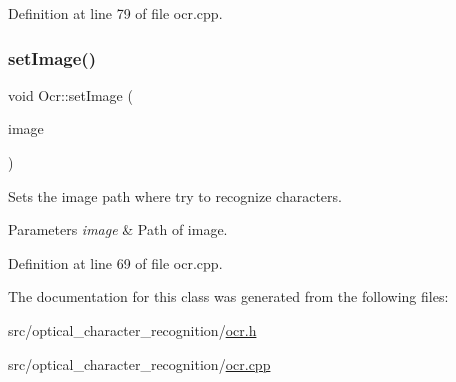 Definition at line 79 of file ocr.\+cpp.

\mbox{\label{classOcr_acdc41b9a0663c194d0fbede8c26ea319}} 
\subsubsection{\texorpdfstring{set\+Image()}{setImage()}}
{\footnotesize\ttfamily void Ocr\+::set\+Image (\begin{DoxyParamCaption}\item[{const Q\+String \&}]{image }\end{DoxyParamCaption})}



Sets the image path where try to recognize characters. 


\begin{DoxyParams}{Parameters}
{\em image} & Path of image. \\
\hline
\end{DoxyParams}


Definition at line 69 of file ocr.\+cpp.



The documentation for this class was generated from the following files\+:\begin{DoxyCompactItemize}
\item 
src/optical\+\_\+character\+\_\+recognition/\mbox{\hyperlink{ocr_8h}{ocr.\+h}}\item 
src/optical\+\_\+character\+\_\+recognition/\mbox{\hyperlink{ocr_8cpp}{ocr.\+cpp}}\end{DoxyCompactItemize}
